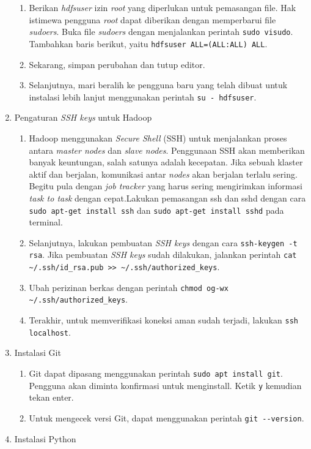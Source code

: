 \begin{enumerate}
\begin{enumerate}
    \item Berikan \textit{hdfsuser} izin \textit{root} yang diperlukan untuk pemasangan file. Hak istimewa pengguna \textit{root} dapat diberikan dengan memperbarui file \textit{sudoers}. Buka file \textit{sudoers} dengan menjalankan perintah \verb|sudo visudo|. Tambahkan baris berikut, yaitu \verb|hdfsuser ALL=(ALL:ALL) ALL|.
    \item Sekarang, simpan perubahan dan tutup editor.
    \item Selanjutnya, mari beralih ke pengguna baru yang telah dibuat untuk instalasi lebih lanjut menggunakan perintah \verb|su - hdfsuser|.
  \end{enumerate}
  \item Pengaturan \textit{SSH keys} untuk Hadoop
  \begin{enumerate}
  	\item Hadoop menggunakan \textit{Secure Shell} (SSH) untuk menjalankan proses antara \textit{master nodes} dan \textit{slave nodes}. Penggunaan SSH akan memberikan banyak keuntungan, salah satunya adalah kecepatan. Jika sebuah klaster aktif dan berjalan, komunikasi antar \textit{nodes} akan berjalan terlalu sering. Begitu pula dengan \textit{job tracker} yang harus sering mengirimkan informasi \textit{task to task} dengan cepat.Lakukan pemasangan ssh dan sshd dengan cara \verb|sudo apt-get install ssh| dan \verb|sudo apt-get install sshd| pada terminal.
    \item Selanjutnya, lakukan pembuatan \textit{SSH keys} dengan cara \verb|ssh-keygen -t rsa|. Jika pembuatan \textit{SSH keys} sudah dilakukan, jalankan perintah \verb|cat ~/.ssh/id_rsa.pub >> ~/.ssh/authorized_keys|.
    \item Ubah perizinan berkas dengan perintah \verb|chmod og-wx ~/.ssh/authorized_keys|.
    \item Terakhir, untuk memverifikasi koneksi aman sudah terjadi, lakukan \verb|ssh localhost|.
  \end{enumerate}
  \item Instalasi Git
  \begin{enumerate}
    \item Git dapat dipasang menggunakan perintah \verb|sudo apt install git|. Pengguna akan diminta konfirmasi untuk menginstall. Ketik \verb|y| kemudian tekan enter.
    \item Untuk mengecek versi Git, dapat menggunakan perintah \verb|git --version|.
  \end{enumerate}
  \item Instalasi Python

\end{enumerate}
